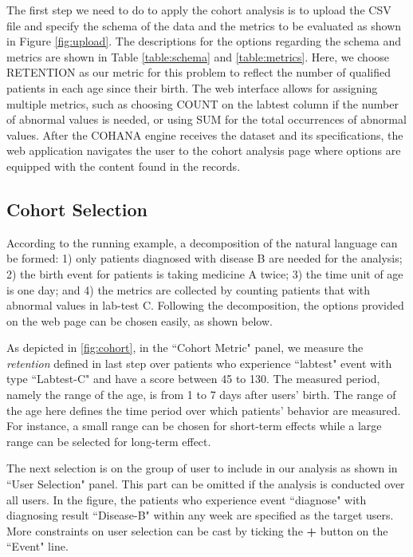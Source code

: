 The first step we need to do to apply the cohort analysis is to upload the CSV file and specify the schema of the data and the metrics to be evaluated as shown in Figure \ref{fig:upload}. 
The descriptions for the options regarding the schema and metrics are shown in Table \ref{table:schema} and \ref{table:metrics}. 
Here, we choose RETENTION as our metric for this problem to reflect the number of qualified patients in each age since their birth. 
The web interface allows for assigning multiple metrics, such as choosing COUNT on the labtest column if the number of abnormal values is needed, or using SUM for the total occurrences of abnormal values. 
After the COHANA engine receives the dataset and its specifications, the web application navigates the user to the cohort analysis page where options are equipped with the content found in the records.

\subsection{Cohort Selection}

According to the running example, a decomposition of the natural language can be formed: 1) only patients diagnosed with disease B are needed for the analysis; 2) the birth event for patients is taking medicine A twice; 3) the time unit of age is one day; and 4) the metrics are collected by counting patients that with abnormal values in lab-test C. 
Following the decomposition, the options provided on the web page can be chosen easily, as shown below.

As depicted in \ref{fig:cohort}, in the ``Cohort Metric" panel, we measure the \emph{retention} defined in last step over patients who experience ``labtest" event with type ``Labtest-C" and have a score between 45 to 130. 
The measured period, namely the range of the age, is from 1 to 7 days after users' birth.
The range of the age here defines the time period over which patients' behavior are measured. For instance, a small range can be chosen for short-term effects while a large range can be selected for long-term effect.

The next selection is on the group of user to include in our analysis as shown in ``User Selection" panel. This part can be omitted if the analysis is conducted over all users. 
In the figure, the patients who experience event ``diagnose" with diagnosing result ``Disease-B" within any week are specified as the target users.
More constraints on user selection can be cast by ticking the \textbf{+} button on the ``Event" line.


